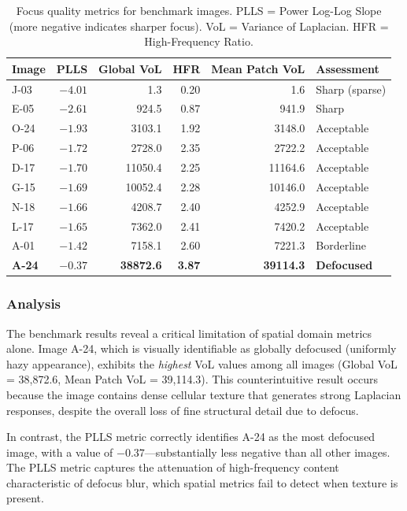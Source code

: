 \begin{table}[htbp]
\centering
\caption{Focus quality metrics for benchmark images. PLLS = Power Log-Log Slope (more negative indicates sharper focus). VoL = Variance of Laplacian. HFR = High-Frequency Ratio.}
\label{tab:focus_benchmark}
\begin{tabular}{@{}lrrrrl@{}}
\toprule
\textbf{Image} & \textbf{PLLS} & \textbf{Global VoL} & \textbf{HFR} & \textbf{Mean Patch VoL} & \textbf{Assessment} \\
\midrule
J-03 & $-4.01$ & 1.3 & 0.20 & 1.6 & Sharp (sparse) \\
E-05 & $-2.61$ & 924.5 & 0.87 & 941.9 & Sharp \\
O-24 & $-1.93$ & 3103.1 & 1.92 & 3148.0 & Acceptable \\
P-06 & $-1.72$ & 2728.0 & 2.35 & 2722.2 & Acceptable \\
D-17 & $-1.70$ & 11050.4 & 2.25 & 11164.6 & Acceptable \\
G-15 & $-1.69$ & 10052.4 & 2.28 & 10146.0 & Acceptable \\
N-18 & $-1.66$ & 4208.7 & 2.40 & 4252.9 & Acceptable \\
L-17 & $-1.65$ & 7362.0 & 2.41 & 7420.2 & Acceptable \\
A-01 & $-1.42$ & 7158.1 & 2.60 & 7221.3 & Borderline \\
\textbf{A-24} & $\mathbf{-0.37}$ & \textbf{38872.6} & \textbf{3.87} & \textbf{39114.3} & \textbf{Defocused} \\
\bottomrule
\end{tabular}
\end{table}

\subsubsection{Analysis}

The benchmark results reveal a critical limitation of spatial domain metrics alone. Image A-24, which is visually identifiable as globally defocused (uniformly hazy appearance), exhibits the \textit{highest} VoL values among all images (Global VoL = 38,872.6, Mean Patch VoL = 39,114.3). This counterintuitive result occurs because the image contains dense cellular texture that generates strong Laplacian responses, despite the overall loss of fine structural detail due to defocus.

In contrast, the PLLS metric correctly identifies A-24 as the most defocused image, with a value of $-0.37$---substantially less negative than all other images. The PLLS metric captures the attenuation of high-frequency content characteristic of defocus blur, which spatial metrics fail to detect when texture is present.

